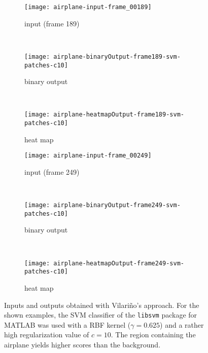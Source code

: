 \begin{figure}[ht]
	\centering
	\begin{subfigure}[h]{0.31\textwidth}
		\texttt{[image: airplane-input-frame\_00189]}	
		\caption*{input (frame 189)}
	\end{subfigure}
	~
	\begin{subfigure}[h]{0.31\textwidth}
		\texttt{[image: airplane-binaryOutput-frame189-svm-patches-c10]}	
		\caption*{binary output}
	\end{subfigure}
	~
	\begin{subfigure}[h]{0.31\textwidth}
		\texttt{[image: airplane-heatmapOutput-frame189-svm-patches-c10]}	
		\caption*{heat map}
	\end{subfigure}
	
	\vspace{3mm}
	\begin{subfigure}[h]{0.31\textwidth}
		\texttt{[image: airplane-input-frame\_00249]}	
		\caption*{input (frame 249)}
	\end{subfigure}
	~
	\begin{subfigure}[h]{0.31\textwidth}
		\texttt{[image: airplane-binaryOutput-frame249-svm-patches-c10]}	
		\caption*{binary output}
	\end{subfigure}	
	~
	\begin{subfigure}[h]{0.31\textwidth}
		\texttt{[image: airplane-heatmapOutput-frame249-svm-patches-c10]}	
		\caption*{heat map}
	\end{subfigure}	
	\caption{Inputs and outputs obtained with Vilari\~no's approach. For the shown examples, the SVM classifier of the {\tt libsvm} package for MATLAB \cite{libsvm} was used with a RBF kernel ($\gamma = 0.625$) and a rather high regularization value of $c = 10$. The region containing the airplane yields higher scores than the background.}
	\label{fig:theirapproachairplane}
\end{figure}


